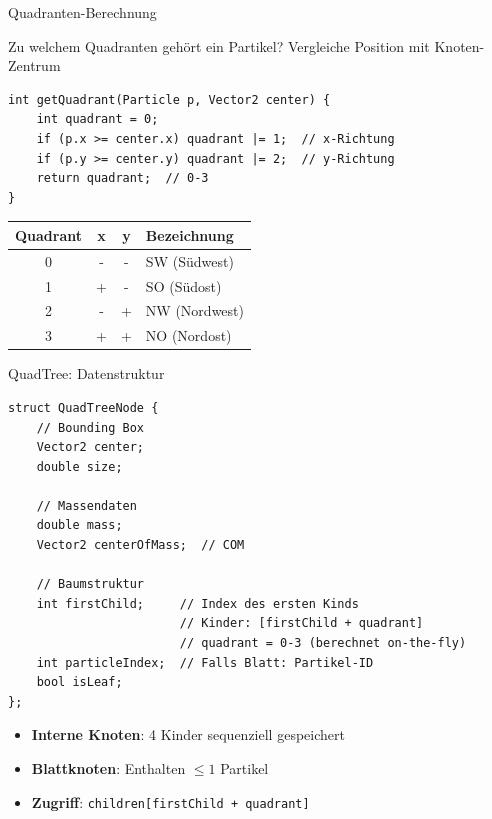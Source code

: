 \documentclass[xcolor=dvipsnames]{beamer}
\begin{document}
\begin{frame}[fragile]{Quadranten-Berechnung}
\begin{block}{Zu welchem Quadranten gehört ein Partikel?}
Vergleiche Position mit Knoten-Zentrum
\end{block}

\begin{lstlisting}[basicstyle=\small\ttfamily]
int getQuadrant(Particle p, Vector2 center) {
    int quadrant = 0;
    if (p.x >= center.x) quadrant |= 1;  // x-Richtung
    if (p.y >= center.y) quadrant |= 2;  // y-Richtung
    return quadrant;  // 0-3
}
\end{lstlisting}

\begin{center}
\begin{tabular}{c|cc|l}
\textbf{Quadrant} & \textbf{x} & \textbf{y} & \textbf{Bezeichnung} \\ \hline
0 & - & - & SW (Südwest) \\
1 & + & - & SO (Südost) \\
2 & - & + & NW (Nordwest) \\
3 & + & + & NO (Nordost)
\end{tabular}
\end{center}
\end{frame}

\begin{frame}[fragile]{QuadTree: Datenstruktur}
\begin{lstlisting}[basicstyle=\small\ttfamily]
struct QuadTreeNode {
    // Bounding Box
    Vector2 center;
    double size;

    // Massendaten
    double mass;
    Vector2 centerOfMass;  // COM

    // Baumstruktur
    int firstChild;     // Index des ersten Kinds
                        // Kinder: [firstChild + quadrant]
                        // quadrant = 0-3 (berechnet on-the-fly)
    int particleIndex;  // Falls Blatt: Partikel-ID
    bool isLeaf;
};
\end{lstlisting}

\begin{itemize}
    \item \textbf{Interne Knoten}: 4 Kinder sequenziell gespeichert
    \item \textbf{Blattknoten}: Enthalten $\leq 1$ Partikel
    \item \textbf{Zugriff}: \texttt{children[firstChild + quadrant]}
\end{itemize}
\end{frame}
\end{document}

